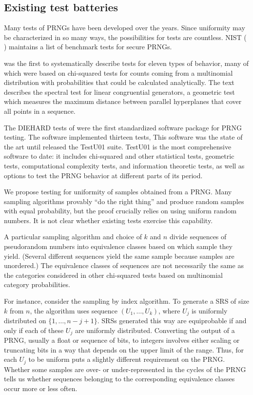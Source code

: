 \documentclass[12pt]{article}
\newcommand{\todo}[1]{{\color{red}{TO DO: \sc #1}}}
\begin{document}
\subsection{Existing test batteries}

Many tests of PRNGs have been developed over the years.
Since uniformity may be characterized in so many ways, the possibilities for tests are countless.
NIST (\cite{soto_statistical_1999, rukhin_statistical_2010} ) maintains a list of benchmark tests for secure PRNGs.

\citet{knuth_art_1997} was the first to systematically describe tests for eleven types of behavior, many of which were based on chi-squared tests for counts coming from a multinomial distribution with probabilities that could be calculated analytically.
The text describes the spectral test for linear congruential generators, a geometric test which measures the maximum distance between parallel hyperplanes that cover all points in a sequence.

The DIEHARD tests of \citet{marsaglia_diehard_1995} were the first standardized software package for PRNG testing.
The software implemented thirteen tests, \todo{}
This software was the state of the art until \citet{lecuyer_testu01_2007} released the TestU01 suite.
TestU01 is the most comprehensive software to date:
it includes chi-squared and other statistical tests, geometric tests, computational complexity tests, and information theoretic tests, as well as options to test the PRNG behavior at different parts of its period.

We propose testing for uniformity of samples obtained from a PRNG.
Many sampling algorithms provably ``do the right thing'' and produce random samples with equal probability, but the proof crucially relies on using uniform random numbers.
It is not clear whether existing tests exercise this capability.

A particular sampling algorithm and choice of $k$ and $n$ divide sequences of pseudorandom numbers into equivalence classes based on which sample they yield.
(Several different sequences yield the same sample because samples are unordered.)
The equivalence classes of sequences are not necessarily the same as the categories considered in other chi-squared tests based on multinomial category probabilities.

For instance, consider the sampling by index algorithm.
To generate a SRS of size $k$ from $n$, the algorithm uses sequence $(U_1, \dots, U_k)$, where 
$U_j$ is uniformly distributed on $\{1, \dots, n - j + 1\}$.
SRSs generated this way are equiprobable if and only if each of these $U_j$ are uniformly distributed.
Converting the output of a PRNG, usually a float or sequence of bits, to integers involves either scaling or truncating bits in a way that depends on the upper limit of the range.
Thus, for each $U_j$ to be uniform puts a slightly different requirement on the PRNG.
Whether some samples are over- or under-represented in the cycles of the PRNG tells us whether sequences belonging to the corresponding equivalence classes occur more or less often.
\end{document}
